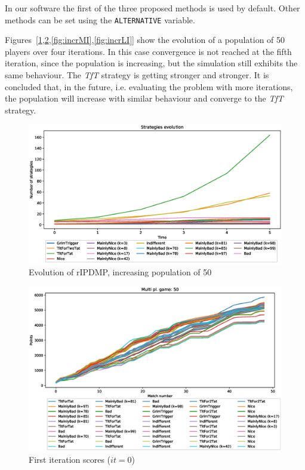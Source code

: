 \documentclass[journal,a4paper,10pt,twoside]{IEEEtran} %
\begin{document}
In our software the first of the three proposed methods is used by default. Other methods can be set using the \texttt{ALTERNATIVE} variable.

Figures~[\ref{fig:incrR},\ref{fig:incrFI},\ref{fig:incrMI},\ref{fig:incrLI}] show the evolution of a population of 50 players over four iterations. In this case convergence is not reached at the fifth iteration, since the population is increasing, but the simulation still exhibits the same behaviour. The \textit{TfT} strategy is getting stronger and stronger. It is concluded that, in the future, i.e. evaluating the problem with more iterations, the population will increase with similar behaviour and converge to the \textit{TfT} strategy.

\begin{figure}[!ht]
    \centering
    \includegraphics[width=1\columnwidth]{../img/ripdmp-incr/ripdmp-evolution-increasing-pop-50}
    \caption{Evolution of rIPDMP, increasing population of 50}
    \label{fig:incrR}
\end{figure}

\begin{figure}[!ht]
    \centering
    \includegraphics[width=1\columnwidth]{../img/ripdmp-incr/ripdmp-scores-increasing-pop-50-r0}
    \caption{First iteration scores ($it=0$)}
    \label{fig:incrFI}
\end{figure}
\end{document}
